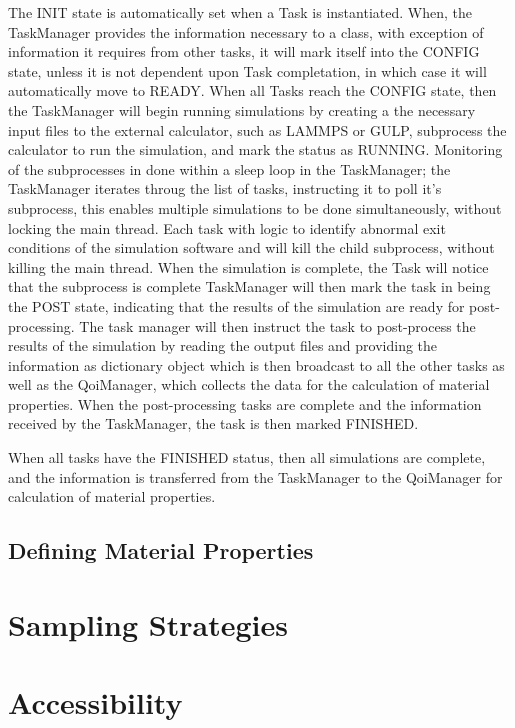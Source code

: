 The INIT state is automatically set when a Task is instantiated.
When, the TaskManager provides the information necessary to a class, with exception of information it requires from other tasks, it will mark itself into the CONFIG state, unless it is not dependent upon Task completation, in which case it will automatically move to READY.
When all Tasks reach the CONFIG state, then the TaskManager will begin running simulations by creating a the necessary input files to the external calculator, such as LAMMPS or GULP, subprocess the calculator to run the simulation, and mark the status as RUNNING.
Monitoring of the subprocesses in done within a sleep loop in the TaskManager; the TaskManager iterates throug the list of tasks, instructing it to poll it's subprocess, this enables multiple simulations to be done simultaneously, without locking the main thread.  Each task with logic to identify abnormal exit conditions of the simulation software and will kill the child subprocess, without killing the main thread.
When the simulation is complete, the Task will notice that the subprocess is complete TaskManager will then mark the task in being the POST state, indicating that the results of the simulation are ready for post-processing.  The task manager will then instruct the task to post-process the results of the simulation by reading the output files and providing the information as dictionary object which is then broadcast to all the other tasks as well as the QoiManager, which collects the data for the calculation of material properties.  When the post-processing tasks are complete and the information received by the TaskManager, the task is then marked FINISHED.

When all tasks have the FINISHED status, then all simulations are complete, and the information is transferred from the TaskManager to the QoiManager for calculation of material properties.

\subsection{Defining Material Properties}

\section{Sampling Strategies}
\label{sec:software_sampling_strategies}

\section{Accessibility}
\label{sec:softwre_acessibility}

